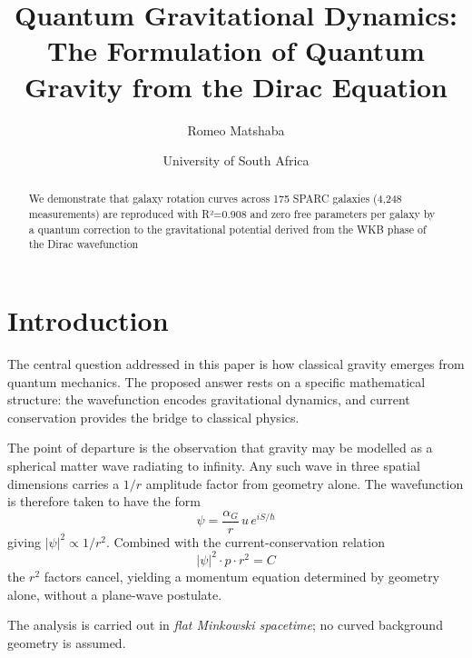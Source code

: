 \documentclass[11pt,a4paper]{article}
\title{Quantum Gravitational Dynamics:\\
	The Formulation of Quantum Gravity from the Dirac Equation}
\author{Romeo Matshaba}
\date{University of South Africa}
\theoremstyle{definition}
\theoremstyle{remark}
\begin{document}
	\maketitle
	
	\begin{abstract}
		We demonstrate that galaxy rotation curves across 175 SPARC galaxies (4,248 measurements) are reproduced with R²=0.908 and zero free parameters per galaxy by a quantum correction to the gravitational potential derived from the WKB phase of the Dirac wavefunction
	\end{abstract}
	
	\section{Introduction}
	
	The central question addressed in this paper is how classical gravity emerges from quantum mechanics.  The proposed answer rests on a specific mathematical structure: the wavefunction encodes gravitational dynamics, and current conservation provides the bridge to classical physics.
	
	The point of departure is the observation that gravity may be modelled as a spherical matter wave radiating to infinity.  Any such wave in three spatial dimensions carries a $1/r$ amplitude factor from geometry alone.  The wavefunction is therefore taken to have the form
	\begin{equation}
		\psi = \frac{\alpha_G}{r}\,u\,e^{iS/\hbar}
	\end{equation}
	giving $|\psi|^2 \propto 1/r^2$.  Combined with the current-conservation relation
	\begin{equation}
		|\psi|^2 \cdot p \cdot r^2 = C
	\end{equation}
	the $r^2$ factors cancel, yielding a momentum equation determined by geometry alone, without a plane-wave postulate.
	
	The analysis is carried out in \textit{flat Minkowski spacetime}; no curved background geometry is assumed.
	
\end{document}
